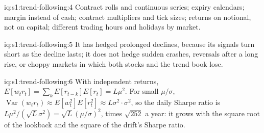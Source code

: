 \begin{solution}{iq:s1:trend-following:4}
Contract rolls and continuous series; expiry calendars; margin instead of cash; contract multipliers and tick sizes; returns on notional, not on
capital; different trading hours and holidays by market.
\end{solution}

\begin{solution}{iq:s1:trend-following:5}
It has hedged prolonged declines, because its signals turn short as the decline lasts; it does not hedge sudden crashes, reversals after a long rise, or
choppy markets in which both stocks and the trend book lose.
\end{solution}

\begin{solution}{iq:s1:trend-following:6}
With independent returns, $E[w_t r_t] = \sum_{k} E[r_{t-k}]E[r_t] = L\mu^2$. For small $\mu/\sigma$, $\operatorname{Var}(w_t r_t) \approx E[w_t^2]E[r_t^2]
\approx L\sigma^2 \cdot \sigma^2$, so the daily Sharpe ratio is $L\mu^2/(\sqrt{L}\sigma^2) = \sqrt{L}(\mu/\sigma)^2$, times $\sqrt{252}$ a year: it grows
with the square root of the lookback and the square of the drift's Sharpe ratio.
\end{solution}
